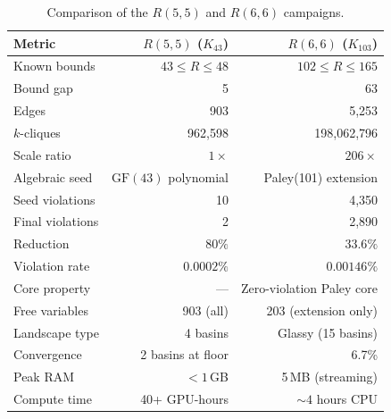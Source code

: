 \documentclass[11pt,a4paper]{article}
\theoremstyle{plain}
\theoremstyle{remark}
\newcommand{\GF}{\mathrm{GF}}
\begin{document}
\begin{table}[H]
\centering
\caption{Comparison of the $R(5,5)$ and $R(6,6)$ campaigns.}
\label{tab:comparison}
\small
\begin{tabular}{@{}lrr@{}}
\toprule
\textbf{Metric} & \textbf{$R(5,5)$ ($K_{43}$)} & \textbf{$R(6,6)$ ($K_{103}$)} \\
\midrule
Known bounds & $43 \leq R \leq 48$ & $102 \leq R \leq 165$ \\
Bound gap & 5 & 63 \\
Edges & 903 & 5{,}253 \\
$k$-cliques & 962{,}598 & 198{,}062{,}796 \\
Scale ratio & $1\times$ & $206\times$ \\
\midrule
Algebraic seed & $\GF(43)$ polynomial & Paley(101) extension \\
Seed violations & 10 & 4{,}350 \\
Final violations & 2 & 2{,}890 \\
Reduction & $80\%$ & $33.6\%$ \\
Violation rate & $0.0002\%$ & $0.00146\%$ \\
\midrule
Core property & --- & Zero-violation Paley core \\
Free variables & 903 (all) & 203 (extension only) \\
Landscape type & 4 basins & Glassy (15 basins) \\
Convergence & 2 basins at floor & 6.7\% \\
\midrule
Peak RAM & $< 1$\,GB & 5\,MB (streaming) \\
Compute time & 40+ GPU-hours & ${\sim}4$ hours CPU \\
\bottomrule
\end{tabular}
\end{table}
\end{document}
